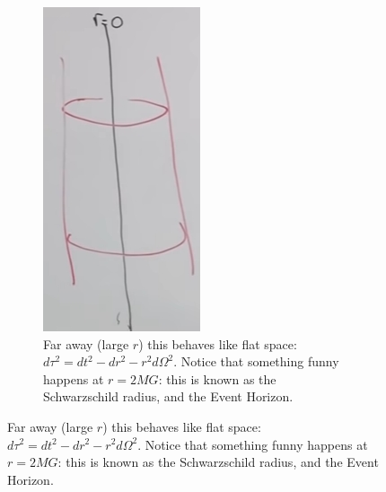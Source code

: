 \documentclass[]{article}
\begin{document}
{\begin{figure}[H]
	\begin{center}
		\caption[Illustrating the Schwarzschild Metric]{Illustrating the Schwarzschild Metric. The vertical axis represents time.}
		\begin{subfigure}[t]{0.45\textwidth}
			\caption{Far away (large $r$) this behaves like flat space: $ d \tau^2 =dt^2-dr^2 - r^2 d\Omega^2$. Notice that something funny happens at $r=2MG$: this is known as the Schwarzschild radius, and the Event Horizon.}\label{fig:gr-6-schwartzchild-radius}
			\includegraphics[width=\textwidth]{gr-6-schwartzchild-radius}

\end{subfigure}
\end{center}
\end{figure}}
\end{document}
